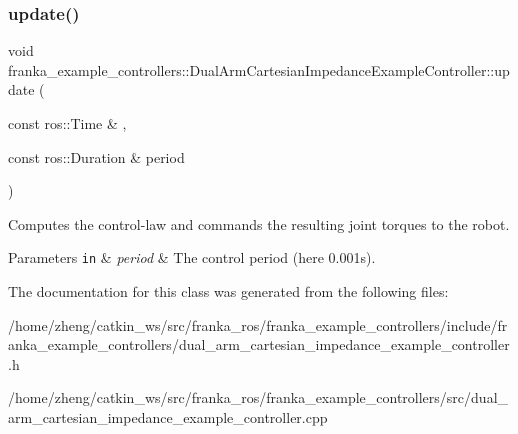 \subsubsection{\texorpdfstring{update()}{update()}}
{\footnotesize\ttfamily void franka\+\_\+example\+\_\+controllers\+::\+Dual\+Arm\+Cartesian\+Impedance\+Example\+Controller\+::update (\begin{DoxyParamCaption}\item[{const ros\+::\+Time \&}]{,  }\item[{const ros\+::\+Duration \&}]{period }\end{DoxyParamCaption})\hspace{0.3cm}{\ttfamily [override]}}

Computes the control-\/law and commands the resulting joint torques to the robot.


\begin{DoxyParams}[1]{Parameters}
\mbox{\tt in}  & {\em period} & The control period (here 0.\+001s). \\
\hline
\end{DoxyParams}


The documentation for this class was generated from the following files\+:\begin{DoxyCompactItemize}
\item 
/home/zheng/catkin\+\_\+ws/src/franka\+\_\+ros/franka\+\_\+example\+\_\+controllers/include/franka\+\_\+example\+\_\+controllers/dual\+\_\+arm\+\_\+cartesian\+\_\+impedance\+\_\+example\+\_\+controller.\+h\item 
/home/zheng/catkin\+\_\+ws/src/franka\+\_\+ros/franka\+\_\+example\+\_\+controllers/src/dual\+\_\+arm\+\_\+cartesian\+\_\+impedance\+\_\+example\+\_\+controller.\+cpp\end{DoxyCompactItemize}
